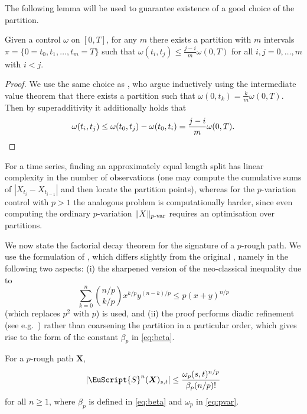 \documentclass{article}
\newcommand{\var}[1]{{#1 \mathchar"2D \mathrm{var}}}
\newcommand{\bX}{\boldsymbol{X}}
\def\Sig{\EuScript{S}}
\numberwithin{equation}{section}
\theoremstyle{definition}
\theoremstyle{remark}
\begin{document}
The following lemma will be used to guarantee existence of a good choice of the partition.
\begin{lemma}\label{lem:pi}
	Given a control $\omega$ on $[0,T]$, for any $m$ there exists a partition with $m$ intervals $\pi = \{0 = t_0, t_1,\ldots, t_m = T\}$ such that $\omega(t_i,t_j) \leq \frac{j-i}{m} \omega(0,T)$ for all $i,j = 0,\ldots,m$ with $i < j$.
\end{lemma}
\begin{proof}
	We use the same choice as \cite[Lemma A.3]{maud2}, who argue inductively using the intermediate value theorem that there exists a partition such that $\omega(0,t_k) = \frac km \omega(0,T)$. Then by superadditivity it additionally holds that
	\[
	\omega(t_i,t_j) \leq \omega(t_0,t_j) - \omega(t_0,t_i) = \frac{j-i}{m} \omega(0,T) . \qedhere
	\]
\end{proof}

\begin{remark}\label{eq:optpart}
	For a time series, finding an approximately equal length split has linear complexity in the number of observations (one may compute the cumulative sums of $|X_{t_i}-X_{t_{i-1}}|$ and then locate the partition points), whereas for the $p$-variation control with $p>1$ the analogous problem is computationally harder, since even computing the ordinary $p$-variation $\| X \|_{\var{p}}$ requires an optimisation over partitions.
\end{remark}

We now state the factorial decay theorem for the signature of a $p$-rough path. We use the formulation of \cite[Theorem 2.3]{LX13}, which differs slightly from the original \cite[Theorem 2.2.1]{Lyo98}, namely in the following two aspects: (i) the sharpened version of the neo-classical inequality due to \cite{HH10}
\begin{equation}\label{eq:neoclassical}
\sum_{k = 0}^n \binom{n/p}{k/p} x^{k/p} y^{(n-k)/p} \leq p(x+y)^{n/p}	
\end{equation}
(which replaces $p^2$ with $p$) is used, and (ii) the proof performs diadic refinement (see e.g.\ \cite{FH20}) rather than coarsening the partition in a particular order, which gives rise to the form of the constant $\beta_p$ in \eqref{eq:beta}.

\begin{theorem}\label{thm:factdec}
For a $p$-rough path $\bX$,
\[
|\Sig^n(\bX)_{s,t}| \leq \frac{\omega_p(s,t)^{n/p}}{\beta_p(n/p)!}
\]
for all $n \geq 1$, where $\beta_p$ is defined in \eqref{eq:beta} and $\omega_p$ in \eqref{eq:pvar}.
\end{theorem}
\end{document}
